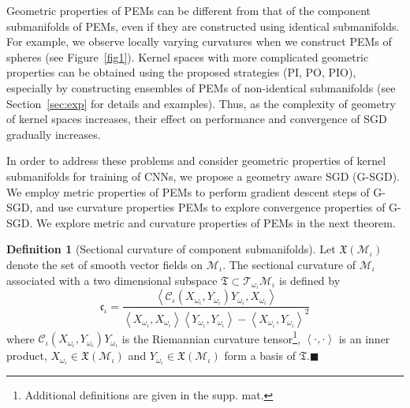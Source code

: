 \documentclass[10pt,journal,compsoc]{IEEEtran}
\newcommand{\Mi}{\mathcal{M}_{\iota}}
\newcommand{\Ci}{\mathcal{C}_{\iota}}
\newcommand{\Oi}{\omega_{\iota}}
\theoremstyle{definition}
\newtheorem{definition}[theorem]{Definition}
\theoremstyle{definition}
\theoremstyle{remark}
\theoremstyle{remark}
\theoremstyle{remark}
\newcommand*{\QEDbs}{\hfill\ensuremath{\blacksquare}}%
\begin{document}
Geometric properties of PEMs can be different from that of the component submanifolds of PEMs, even if they are constructed using identical submanifolds. For example, we observe locally varying curvatures when we construct PEMs of spheres (see Figure~\ref{fig1}). Kernel spaces with more complicated geometric properties can be obtained using the proposed strategies (PI, PO, PIO), especially by constructing ensembles of PEMs of non-identical submanifolds (see Section~\ref{sec:exp} for details and examples). Thus, as the complexity of geometry of kernel spaces increases, their effect on performance and convergence of SGD gradually increases. 

In order to address these problems and consider geometric properties of kernel submanifolds for training of CNNs, we propose a geometry aware SGD (G-SGD). We employ metric properties of PEMs to perform gradient descent steps of G-SGD, and use curvature properties PEMs to explore convergence properties of G-SGD. We  explore metric and curvature properties of PEMs in the next theorem. 




\begin{definition}[Sectional curvature of component submanifolds]
	Let $\mathfrak{X}(\Mi)$ denote the set of smooth vector fields on $\Mi$. The sectional curvature of $\Mi$ associated with a two dimensional subspace $\mathfrak{T} \subset \mathcal{T}_{\Oi}\Mi$  is defined by 
	\begin{equation}
	\mathfrak{c}_{\iota} = \frac{\left\langle \Ci(X_{\Oi},Y_{\Oi})Y_{\Oi},X_{\Oi}  \right\rangle}{\left\langle  X_{\Oi} , X_{\Oi} \right\rangle \left\langle  Y_{\Oi} , Y_{\Oi} \right\rangle  -   \left\langle X_{\Oi} ,Y_{\Oi} \right\rangle^2}
	\end{equation}
	where $\Ci(X_{\Oi},Y_{\Oi})Y_{\Oi}$ is the Riemannian curvature tensor\footnote{Additional definitions are given in the supp. mat.}, $\left\langle \cdot,\cdot \right\rangle$ is an inner product, ${X_{\Oi} \in \mathfrak{X}(\Mi)}$ and ${Y_{\Oi} \in \mathfrak{X}(\Mi)}$ form a basis of $\mathfrak{T}$.\QEDbs	
\end{definition}
\end{document}
